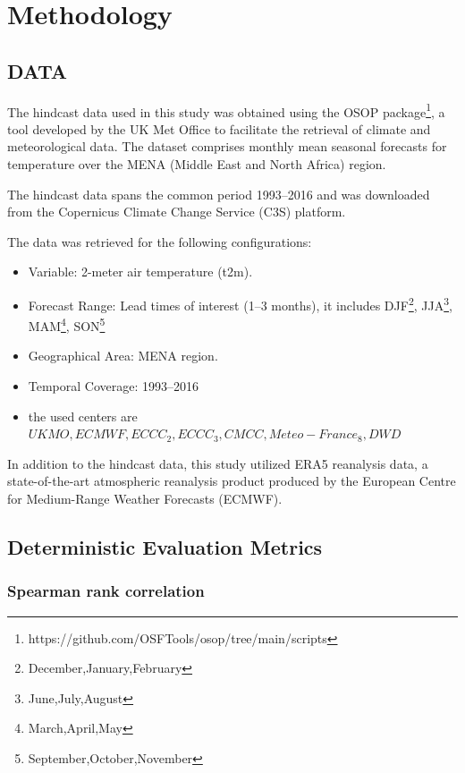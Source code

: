 \section{Methodology}

\subsection{DATA}

The hindcast data used in this study was obtained using the OSOP package\footnote{https://github.com/OSFTools/osop/tree/main/scripts}, a tool developed by the UK Met Office to facilitate the retrieval of climate and meteorological data. The dataset comprises monthly mean seasonal forecasts for temperature over the MENA (Middle East and North Africa) region.


The hindcast data spans the common period 1993–2016 and was downloaded from the Copernicus Climate Change Service (C3S) platform. 


The data was retrieved for the following configurations:
\begin{itemize}
	\item Variable: 2-meter air temperature (t2m).
	\item Forecast Range: Lead times of interest (1–3 months), it includes DJF\footnote{December,January,February}, JJA\footnote{June,July,August}, MAM\footnote{March,April,May}, SON\footnote{September,October,November}
	\item Geographical Area: MENA region.
	\item Temporal Coverage: 1993–2016
	\item the used centers are $UKMO,ECMWF,ECCC_2,ECCC_3,CMCC,Meteo-France_8,DWD$
\end{itemize}


In addition to the hindcast data, this study utilized ERA5 reanalysis data, a state-of-the-art atmospheric reanalysis product produced by the European Centre for Medium-Range Weather Forecasts (ECMWF). 

    

\subsection{Deterministic Evaluation Metrics}

\subsubsection{Spearman rank correlation}


